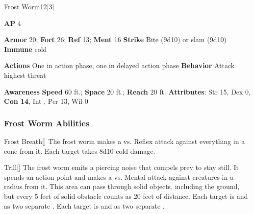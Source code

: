 \begin{monsection}{Frost Worm}{12}[3]
\vspace{-1em}\vspace{-1em}
\begin{spellcontent}
\begin{spelltargetinginfo}
{\textbf{AP} 4}

\pari \textbf{Armor} 20;
\textbf{Fort} 26;
\textbf{Ref} 13;
\textbf{Ment} 16
\pari \textbf{Strike} Bite  (9d10) or slam  (9d10)
\pari \textbf{Immune} cold

\pari \textbf{Actions} One in action phase, one in delayed action phase
\pari \textbf{Behavior} Attack highest threat
\end{spelltargetinginfo}
\end{spellcontent}

\begin{monsterfooter}
\pari \textbf{Awareness} 
\pari \textbf{Speed} 60 ft.;
\textbf{Space} 20 ft.;
\textbf{Reach} 20 ft.
\pari \textbf{Attributes}:
Str 15,
Dex 0,
\textbf{Con 14},
Int ,
Per 13,
Wil 0
\end{monsterfooter}
\end{monsection}


\subsubsection{Frost Worm Abilities}

\begin{ability}{Frost Breath}[]
The frost worm makes a  vs. Reflex attack against everything in a \arealarge cone from it.
\hit Each target takes 8d10 cold damage.
\end{ability}

\vspace{0.5em}
\begin{ability}{Trill}[]
The frost worm emits a piercing noise that compels prey to stay still.
It spends an action point and makes a  vs. Mental attack against creatures in a \areahuge radius from it.
This area can pass through solid objects, including the ground, but every 5 feet of solid obstacle counts as 20 feet of distance.
\hit Each target is  and  as two separate .
\crit Each target is  and  as two separate .
\end{ability}

